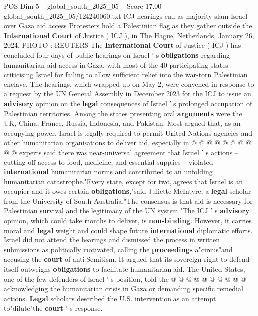 \begin{textsample}{POS Dim 5 – global\_south\_2025\_05 – Score 17.00 – global\_south\_2025\_05/124240060.txt}  \label{ex:f5_pos_194}
ICJ hearings end as majority slam Israel over Gaza aid access Protesters hold a Palestinian flag as they gather outside the \textbf{International} \textbf{Court} of Justice ( ICJ ), in The Hague, Netherlands, January 26, 2024.
PHOTO : REUTERS The \textbf{International} \textbf{Court} of Justice ( ICJ ) has concluded four days of public hearings on Israel ' s \textbf{obligations} regarding humanitarian aid access in Gaza, with most of the 40 participating states criticising Israel for failing to allow sufficient relief into the war-torn Palestinian enclave.
The hearings, which wrapped up on May 2, were convened in response to a request by the UN General Assembly in December 2023 for the ICJ to issue an \textbf{advisory} opinion on the \textbf{legal} consequences of Israel ' s prolonged occupation of Palestinian territories.
Among the states presenting oral \textbf{arguments} were the UK, China, France, Russia, Indonesia, and Pakistan.
Most argued that, as an occupying power, Israel is legally required to permit United Nations agencies and other humanitarian organisations to deliver aid, especially in @ @ @ @ @ @ @ @ @ @ experts said there was near-universal agreement that Israel ' s actions -- cutting off access to food, medicine, and essential supplies -- violated \textbf{international} humanitarian norms and contributed to an unfolding humanitarian catastrophe."Every state, except for two, agrees that Israel is an occupier and it owes certain \textbf{obligations},"said Juliette McIntyre, a \textbf{legal} scholar from the University of South Australia."The consensus is that aid is necessary for Palestinian survival and the legitimacy of the UN system."The ICJ ' s \textbf{advisory} opinion, which could take months to deliver, is \textbf{non-binding}.
However, it carries moral and \textbf{legal} weight and could shape future \textbf{international} diplomatic efforts.
Israel did not attend the hearings and dismissed the process in written submissions as politically motivated, calling the \textbf{proceedings} a"circus"and accusing the \textbf{court} of anti-Semitism.
It argued that its sovereign right to defend itself outweighs \textbf{obligations} to facilitate humanitarian aid.
The United States, one of the few defenders of Israel ' s position, told the @ @ @ @ @ @ @ @ @ @ acknowledging the humanitarian crisis in Gaza or demanding specific remedial actions. \textbf{Legal} scholars described the U.S. intervention as an attempt to"dilute"the \textbf{court} ' s response.

\end{textsample}

